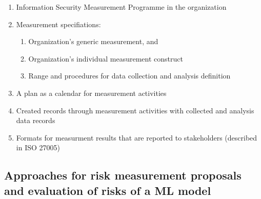 \begin{enumerate}[label=(\alph*)]
  \begin{enumerate}
    \item Information Security Measurement Programme in the organization
    \item Measurement specifiations:
      \begin{enumerate}
        \item Organization's generic measurement, and
        \item Organization's individual measurement construct
        \item Range and procedures for data collection and analysis definition
      \end{enumerate}
      \item A plan as a calendar for measurement activities
      \item Created records through measurement activities with collected and analysis data records
      \item Formats for measurment results that are reported to stakeholders (described in ISO 27005)
  \end{enumerate}
\end{enumerate}

\subsection{Approaches for risk measurement proposals and evaluation of risks of a ML model}
\label{sec:approaches}

